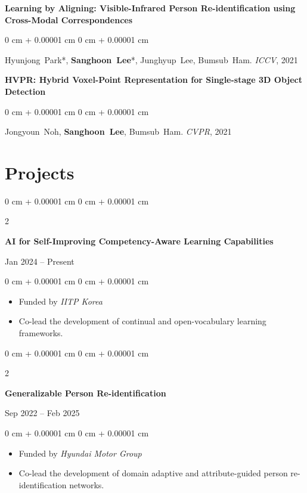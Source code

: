 \documentclass[10pt, letterpaper]{article}
\newenvironment{highlights}{
    \begin{itemize}[
        topsep=0.10 cm,
        parsep=0.10 cm,
        partopsep=0pt,
        itemsep=0pt,
        leftmargin=0 cm + 10pt
    ]
}{
    \end{itemize}
} %
\newenvironment{onecolentry}{
    \begin{adjustwidth}{
        0 cm + 0.00001 cm
    }{
        0 cm + 0.00001 cm
    }
}{
    \end{adjustwidth}
} %
\newenvironment{twocolentry}[2][]{
    \onecolentry
    \def\secondColumn{#2}
    \setcolumnwidth{\fill, 4.5 cm}
    \begin{paracol}{2}
}{
    \switchcolumn \raggedleft \secondColumn
    \end{paracol}
    \endonecolentry
} %
\begin{document}
        \textbf{Learning by Aligning: Visible-Infrared Person Re-identification using Cross-Modal Correspondences}
        \begin{onecolentry}
                \mbox{Hyunjong Park*}, \mbox{\textbf{Sanghoon Lee}*}, \mbox{Junghyup Lee}, \mbox{Bumsub Ham}.\newline
        	\textit{ICCV}, 2021
        \end{onecolentry}
        \vspace{0.10 cm}
        
        \textbf{HVPR: Hybrid Voxel-Point Representation for Single-stage 3D Object Detection}
        \begin{onecolentry}
                \mbox{Jongyoun Noh}, \mbox{\textbf{Sanghoon Lee}}, \mbox{Bumsub Ham}.\newline
        	\textit{CVPR}, 2021
        \end{onecolentry}
        \vspace{0.10 cm}

    \section{Projects}
        \begin{twocolentry}{Jan 2024 – Present}
        \textbf{AI for Self-Improving Competency-Aware Learning Capabilities}
        \end{twocolentry}
        \begin{onecolentry}
        \begin{highlights}\setlength\itemsep{0em}\setlength\parskip{0em}
            \item Funded by \textit{IITP Korea}
            \item Co-lead the development of continual and open-vocabulary learning frameworks.
        \end{highlights}
        \end{onecolentry}
        \vspace{0.2 cm}
        
        \begin{twocolentry}{Sep 2022 – Feb 2025}
        \textbf{Generalizable Person Re-identification}
        \end{twocolentry}
        \begin{onecolentry}
        \begin{highlights}\setlength\itemsep{0em}\setlength\parskip{0em}
            \item Funded by \textit{Hyundai Motor Group}
            \item Co-lead the development of domain adaptive and attribute-guided person re-identification networks.
        \end{highlights}
        \end{onecolentry}
        \vspace{0.2 cm}
        
\end{document}
